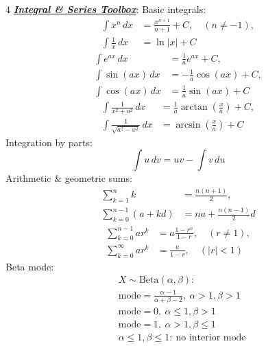 \documentclass[12pt]{article}
\newcommand{\bulletPoint}[1]{\ul{\textit{\textbf{#1}}}}
\begin{document}
\begin{multicols*}{4}
\bulletPoint{Integral \& Series Toolbox}:
Basic integrals:
\useshortskip \begin{equation*}
    \begin{split}
        \int x^n\,dx&=\frac{x^{n+1}}{n+1}+C,\quad (n\neq -1),\\
        \int \frac{1}{x}\,dx&=\ln|x|+C
    \end{split}
\end{equation*}
\useshortskip \begin{equation*}
    \begin{split}
        \int e^{ax}\,dx&=\frac{1}{a}e^{ax}+C,\\
        \int \sin(ax)\,dx&=-\frac{1}{a}\cos(ax)+C,\\
        \int \cos(ax)\,dx&=\frac{1}{a}\sin(ax)+C
    \end{split}
\end{equation*}
\useshortskip \begin{equation*}
    \begin{split}
        \int \frac{1}{x^2+a^2}\,dx
        &=\frac{1}{a}\arctan\!\left(\frac{x}{a}\right)+C,\\
        \int \frac{1}{\sqrt{a^2-x^2}}\,dx
        &=\arcsin\!\left(\frac{x}{a}\right)+C
    \end{split}
\end{equation*}
Integration by parts:
\useshortskip \begin{equation*}
    \int u\,dv=uv-\int v\,du
\end{equation*}
Arithmetic \& geometric sums:
\useshortskip \begin{equation*}
    \begin{split}
        \sum_{k=1}^{n}k&=\frac{n(n+1)}{2},\\
        \sum_{k=0}^{n-1}(a+kd)&=na+\frac{n(n-1)}{2}d
    \end{split}
\end{equation*}
\useshortskip \begin{equation*}
    \begin{split}
        \sum_{k=0}^{n-1}ar^k&=a\frac{1-r^n}{1-r},\quad (r\neq 1),\\
        \sum_{k=0}^{\infty}ar^k&=\frac{a}{1-r},\quad (|r|<1)
    \end{split}
\end{equation*}
Beta mode:
\useshortskip \begin{equation*}
    \begin{split}
    &X\sim\mathrm{Beta}(\alpha,\beta): \\
    &\mathrm{mode}=\frac{\alpha-1}{\alpha+\beta-2},
    \ \alpha>1,\beta>1\\
    &\mathrm{mode}=0,\ \alpha\le 1,\beta>1\\
    &\mathrm{mode}=1,\ \alpha>1,\beta\le 1\\
    &\alpha\le 1,\beta\le 1:\ \text{no interior mode}
    \end{split}
\end{equation*}


\end{multicols*}
\end{document}
